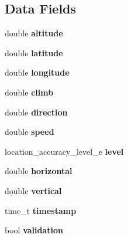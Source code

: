 \subsection*{Data Fields}
\begin{DoxyCompactItemize}
\item 
\hypertarget{struct__location_a2b13d276aee0d9fd646c8fa3647e869b}{double {\bfseries altitude}}\label{struct__location_a2b13d276aee0d9fd646c8fa3647e869b}

\item 
\hypertarget{struct__location_a76714bdbc5c536fa77dfb14533ff82a9}{double {\bfseries latitude}}\label{struct__location_a76714bdbc5c536fa77dfb14533ff82a9}

\item 
\hypertarget{struct__location_ac155e35fdeebafc89723a51520fb9fe6}{double {\bfseries longitude}}\label{struct__location_ac155e35fdeebafc89723a51520fb9fe6}

\item 
\hypertarget{struct__location_a72cbc74638e72ebd02fc3b0bd2cb80af}{double {\bfseries climb}}\label{struct__location_a72cbc74638e72ebd02fc3b0bd2cb80af}

\item 
\hypertarget{struct__location_a8da9718bd3d0396135453cbb12751a5b}{double {\bfseries direction}}\label{struct__location_a8da9718bd3d0396135453cbb12751a5b}

\item 
\hypertarget{struct__location_a6dc6e6f3c75c509ce943163afb5dade7}{double {\bfseries speed}}\label{struct__location_a6dc6e6f3c75c509ce943163afb5dade7}

\item 
\hypertarget{struct__location_ab42edaa8e596f16b6ff545b9256a4508}{location\-\_\-accuracy\-\_\-level\-\_\-e {\bfseries level}}\label{struct__location_ab42edaa8e596f16b6ff545b9256a4508}

\item 
\hypertarget{struct__location_aababb3cab13d0b7706c591b114d9ef9a}{double {\bfseries horizontal}}\label{struct__location_aababb3cab13d0b7706c591b114d9ef9a}

\item 
\hypertarget{struct__location_af585cb3fb143047cf641307ab9f5a2f0}{double {\bfseries vertical}}\label{struct__location_af585cb3fb143047cf641307ab9f5a2f0}

\item 
\hypertarget{struct__location_a2f48d949c7a1e7bf2ce81c70caa7c3ec}{time\-\_\-t {\bfseries timestamp}}\label{struct__location_a2f48d949c7a1e7bf2ce81c70caa7c3ec}

\item 
\hypertarget{struct__location_a421230405ce8a68e92b05f37a8eac23c}{bool {\bfseries validation}}\label{struct__location_a421230405ce8a68e92b05f37a8eac23c}

\end{DoxyCompactItemize}


